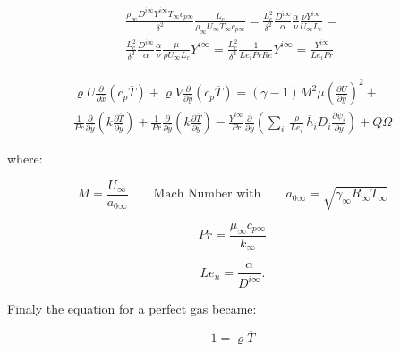 \begin{equation}
\begin{split}
\frac{\rho_{\infty}D^{i\infty}Y^{i\infty}T_{\infty}c_{p\infty}}{\delta^2}
\frac{L_c}{\rho_{\infty}U_{\infty}T_{\infty}c_{p\infty}}
=
\frac{L_c^2}{\delta^2}
\frac{D^{i\infty}}{\alpha}
\frac{\alpha}{\nu}
\frac{\nu Y^{i\infty}}{U_{\infty}L_c}
=
\\
\frac{L_c^2}{\delta^2}
\frac{D^{i\infty}}{\alpha}
\frac{\alpha}{\nu}
\frac{\mu }{\rho U_{\infty}L_c}
Y^{i\infty}
=
\frac{L_c^2}{\delta^2}
\frac{1}{Le_iPrRe}Y^{i\infty}
=
\frac{Y^{i\infty}}{Le_iPr}
\end{split}
\end{equation} 

\begin{equation}
\begin{split}
\varrho U\frac{\partial }{\partial \overline{x}}(c_p \overline{T})+
\varrho V\frac{\partial }{\partial \overline{y}}(c_p \overline{T})
=
(\gamma-1)M^2\mu
\left(
\frac{\partial U}{\partial \overline{y}}
\right)^2
+
\\
\frac{1}{Pr}\frac{\partial}{\partial \overline{y}}\left(k\frac{\partial \overline{T}}{\partial \overline{y}}\right)
+
\frac{1}{Pr}\frac{\partial}{\partial \overline{y}}\left(k\frac{\partial \overline{T}}{\partial \overline{y}}\right)
-
\frac{Y^{i\infty}}{Pr}
\frac{\partial }{\partial \overline{y}}
\left(
\sum_i \frac{\varrho}{Le_i}\overline{h}_i D_i\frac{\partial \psi_i}{\partial \overline{y}}
\right)
+
Q\Omega
\end{split}
\end{equation} 

where:

\begin{equation}
M=\frac{U_{\infty}}{a_{0\infty}}\qquad\text{Mach Number with}\qquad a_{0\infty}=\sqrt{\gamma_{\infty}R_{\infty}T_{\infty}}
\end{equation} 

\begin{equation}
Pr=\frac{\mu_{\infty}c_{p\infty}}{k_{\infty}}
\end{equation} 

\begin{equation}
Le_n=\frac{\alpha}{D^{i\infty}}.
\end{equation} 

Finaly the equation for a perfect gas became:  

\begin{equation}
1=\varrho\overline{T}
\end{equation} 


